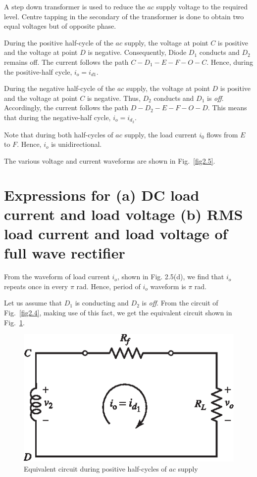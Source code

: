 A step down transformer is used to reduce the $ac$ supply voltage to
the required level. Centre tapping in the secondary of the transformer
is done to obtain two equal voltages but of opposite phase.

During the positive half-cycle of the $ac$ supply, the voltage at
point $C$ is positive and the voltage at point $D$ is
negative. Consequently, Diode $D_1$ conducts and $D_2$ remains
off. The current follows the path $C-D_1-E-F-O-C$. Hence, during the
positive-half cycle, $i_o  = i_{d1}$.

During the negative half-cycle of the $ac$ supply, the voltage at
point $D$ is positive and the voltage at point $C$ is negative. Thus,
$D_2$ conducts and $D_1$ is \textit{off}. Accordingly, the current
follows the path $D-D_2 - E-F -O-D$. This means that during the
negative-half cycle, $i_o = i_{d_2}$.

Note that during both half-cycles of $ac$ supply, the load current
$i_0$ flows from $E$ to $F$. Hence, $i_o$ is unidirectional.

The various voltage and current waveforms are shown in Fig.~\ref{fig2.5}.

\section{Expressions for (a) DC load current and load voltage
(b) RMS load current and load voltage of full wave rectifier}\label{sec2.10}

From the waveform of load current $i_o$, shown in Fig. 2.5(d), we find
that $i_o$ repeats once in every $\pi$ rad. Hence, period of $i_o$ waveform is
$\pi$ rad.

Let us assume that $D_1$ is conducting and $D_2$ is \textit{off}. From
the circuit of Fig.~\ref{fig2.4}, making use of this fact, we get the equivalent
circuit shown in Fig.~\ref{fig2.6}.
\begin{figure}[H]
\centering
\includegraphics{chap2/add-fig/S3-EE-02-006.eps}
\caption{Equivalent circuit during positive half-cycles of $ac$ supply}\label{fig2.6}
\end{figure}


